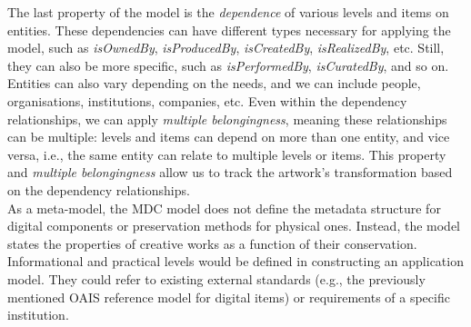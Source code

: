 The last property of the model is the \textit{dependence} of various levels and items on entities. These dependencies can have different types necessary for applying the model, such as \textit{isOwnedBy}, \textit{isProducedBy}, \textit{isCreatedBy}, \textit{isRealizedBy}, etc. Still, they can also be more specific, such as \textit{isPerformedBy}, \textit{isCuratedBy}, and so on. Entities can also vary depending on the needs, and we can include people, organisations, institutions, companies, etc. Even within the dependency relationships, we can apply \textit{multiple belongingness}, meaning these relationships can be multiple: levels and items can depend on more than one entity, and vice versa, i.e., the same entity can relate to multiple levels or items. This property and \textit{multiple belongingness} allow us to track the artwork's transformation based on the dependency relationships.\\
As a meta-model, the MDC model does not define the metadata structure for digital components or preservation methods for physical ones. Instead, the model states the properties of creative works as a function of their conservation. Informational and practical levels would be defined in constructing an application model. They could refer to existing external standards (e.g., the previously mentioned OAIS reference model for digital items) or requirements of a specific institution.

